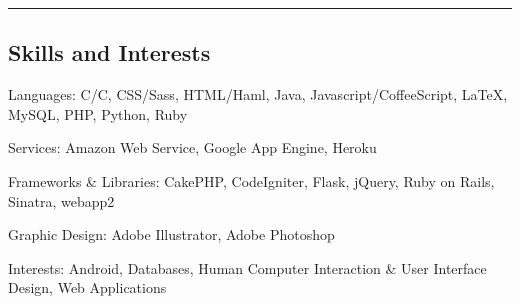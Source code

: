 \documentclass[10pt,letterpaper]{article}
\newcommand{\CPP}
{C\nolinebreak[4]\hspace{-.05em}\raisebox{.22ex}{\footnotesize\bf ++}}
\begin{document}
\hrule
\vspace{-0.4em}
\subsection*{Skills and Interests}

\begin{description*}
	\item[Languages:]
       C/\CPP, CSS/Sass, HTML/Haml, Java, Javascript/CoffeeScript, \LaTeX, MySQL, PHP, Python, Ruby
	\item[Services:]
	Amazon Web Service, Google App Engine, Heroku
	\item[Frameworks \& Libraries:]
	CakePHP, CodeIgniter, Flask, jQuery, Ruby on Rails, Sinatra, webapp2
	\item[Graphic Design:]
	Adobe Illustrator, Adobe Photoshop
	\item[Interests:]
	Android, Databases, Human Computer Interaction \& User Interface Design, Web 
	Applications
\end{description*}
\end{document}
